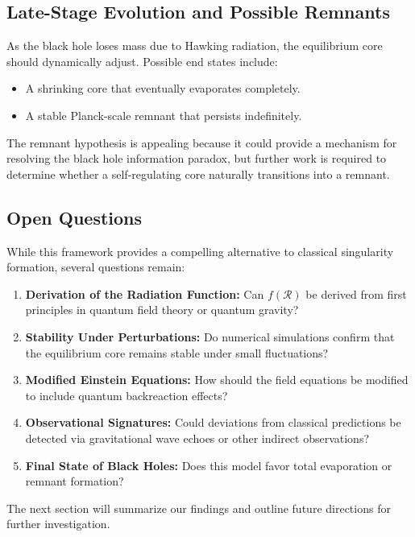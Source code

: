 \subsection{Late-Stage Evolution and Possible Remnants}
As the black hole loses mass due to Hawking radiation, the equilibrium core should dynamically adjust. Possible end states include:
\begin{itemize}
    \item A shrinking core that eventually evaporates completely.
    \item A stable Planck-scale remnant that persists indefinitely.
\end{itemize}
The remnant hypothesis is appealing because it could provide a mechanism for resolving the black hole information paradox, but further work is required to determine whether a self-regulating core naturally transitions into a remnant.

\subsection{Open Questions}
While this framework provides a compelling alternative to classical singularity formation, several questions remain:
\begin{enumerate}
    \item \textbf{Derivation of the Radiation Function:} Can \( f(\mathcal{R}) \) be derived from first principles in quantum field theory or quantum gravity?
    \item \textbf{Stability Under Perturbations:} Do numerical simulations confirm that the equilibrium core remains stable under small fluctuations?
    \item \textbf{Modified Einstein Equations:} How should the field equations be modified to include quantum backreaction effects?
    \item \textbf{Observational Signatures:} Could deviations from classical predictions be detected via gravitational wave echoes or other indirect observations?
    \item \textbf{Final State of Black Holes:} Does this model favor total evaporation or remnant formation?
\end{enumerate}

The next section will summarize our findings and outline future directions for further investigation.
